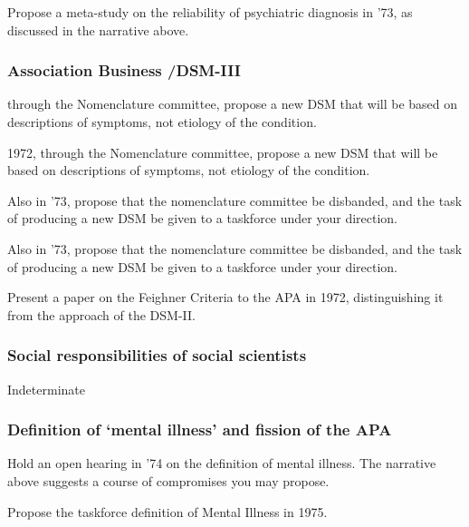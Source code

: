 \begin{refsection}
Propose a meta-study on the reliability of psychiatric diagnosis in '73, as discussed in the narrative above.

\subsubsection{Association Business \slash  DSM-III}
\label{associationbusinessdsm-iii}

\begin{proposal}[Spitzer]\label{proposal:spitzerA} through the Nomenclature committee, propose a new DSM that will be based on descriptions of symptoms, not etiology of the condition.\end{proposal}

1972, through the Nomenclature committee, propose a new DSM that will be based on descriptions of symptoms, not etiology of the condition.

\begin{proposal}[Spitzer]\label{proposal:spitzerC} Also in '73, propose that the nomenclature committee be disbanded, and the task of producing a new DSM be given to a taskforce under your direction.\end{proposal}Also in '73, propose that the nomenclature committee be disbanded, and the task of producing a new DSM be given to a taskforce under your direction.

\begin{writingtask}[Spitzer]\label{writingtask:spitzer}
Present a paper on the Feighner Criteria to the APA in 1972, distinguishing it from the approach of the DSM-II.
\end{writingtask}

\subsubsection{Social responsibilities of social scientists}
\label{socialresponsibilitiesofsocialscientists}

Indeterminate

\subsubsection{Definition of ‘mental illness’ and fission of the APA}
\label{definitionof‘mentalillness’andfissionoftheapa}

Hold an open hearing in '74 on the definition of mental illness. The narrative above suggests a course of compromises you may propose.

\begin{proposal}[Spitzer]\label{proposal:spitzerD}
Propose the taskforce definition of Mental Illness in 1975.\end{proposal}


\end{refsection}
